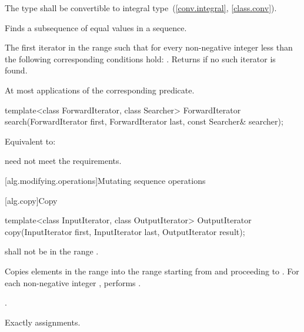 \begin{itemdescr}
\pnum
\requires
The type
shall be convertible to integral type~(\ref{conv.integral}, \ref{class.conv}).

\pnum
\effects
Finds a subsequence of equal values in a sequence.

\pnum
\returns
The first iterator
in the range 
such that for every non-negative integer
less than
the following corresponding conditions hold:
.
Returns 
if no such iterator is found.

\pnum
\complexity
At most
applications of the corresponding predicate.
\end{itemdescr}

%
\begin{itemdecl}
template<class ForwardIterator, class Searcher>
  ForwardIterator search(ForwardIterator first, ForwardIterator last,
                         const Searcher& searcher);
\end{itemdecl}

\begin{itemdescr}
\pnum
\effects
Equivalent to: 

\pnum
\remarks
{} need not meet the  requirements.
\end{itemdescr}


[alg.modifying.operations]{Mutating sequence operations}

[alg.copy]{Copy}

%
\begin{itemdecl}
template<class InputIterator, class OutputIterator>
  OutputIterator copy(InputIterator first, InputIterator last,
                      OutputIterator result);
\end{itemdecl}

\begin{itemdescr}
\pnum
\requires {} shall not be in the range .

\pnum
\effects Copies elements in the range  into the range  starting from  and proceeding to . For each non-negative integer , performs .

\pnum
\returns {}.

\pnum
\complexity Exactly  assignments.
\end{itemdescr}

